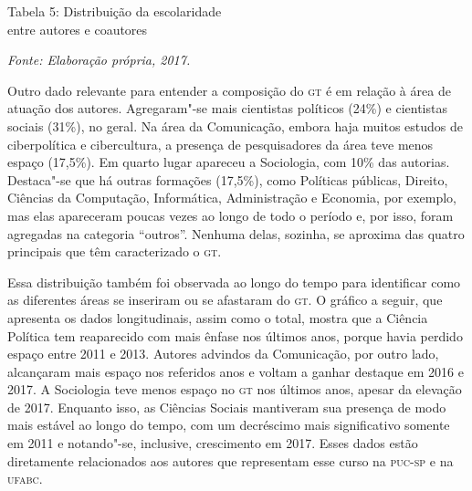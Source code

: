 \begin{center}
Tabela 5: Distribuição da escolaridade\\ entre autores e coautores\bigskip


{\footnotesize\emph{Fonte: Elaboração própria, 2017.}}
\end{center}

Outro dado relevante para entender a composição do \textsc{gt} é em relação à
área de atuação dos autores. Agregaram"-se mais cientistas
políticos (24\%) e cientistas sociais (31\%), no geral. Na área da
Comunicação, embora haja muitos estudos de ciberpolítica e cibercultura,
a presença de pesquisadores da área teve menos espaço (17,5\%). Em
quarto lugar apareceu a Sociologia, com 10\% das autorias. Destaca"-se
que há outras formações (17,5\%), como Políticas públicas, Direito,
Ciências da Computação, Informática, Administração e Economia, por
exemplo, mas elas apareceram poucas vezes ao longo de todo o período e,
por isso, foram agregadas na categoria ``outros''. Nenhuma delas,
sozinha, se aproxima das quatro principais que têm caracterizado o \textsc{gt}.

Essa distribuição também foi observada ao longo do tempo para
identificar como as diferentes áreas se inseriram ou se afastaram do \textsc{gt}.
O gráfico a seguir, que apresenta os dados longitudinais, assim como o
total, mostra que a Ciência Política tem reaparecido com mais ênfase nos
últimos anos, porque havia perdido espaço entre 2011 e 2013. Autores
advindos da Comunicação, por outro lado, alcançaram mais espaço nos
referidos anos e voltam a ganhar destaque em 2016 e 2017. A Sociologia
teve menos espaço no \textsc{gt} nos últimos anos, apesar da elevação de 2017.
Enquanto isso, as Ciências Sociais mantiveram sua presença de modo mais
estável ao longo do tempo, com um decréscimo mais significativo somente
em 2011 e notando"-se, inclusive, crescimento em 2017. Esses dados estão
diretamente relacionados aos autores que representam esse curso na
\textsc{puc}-\textsc{sp} e na \textsc{ufabc}.


